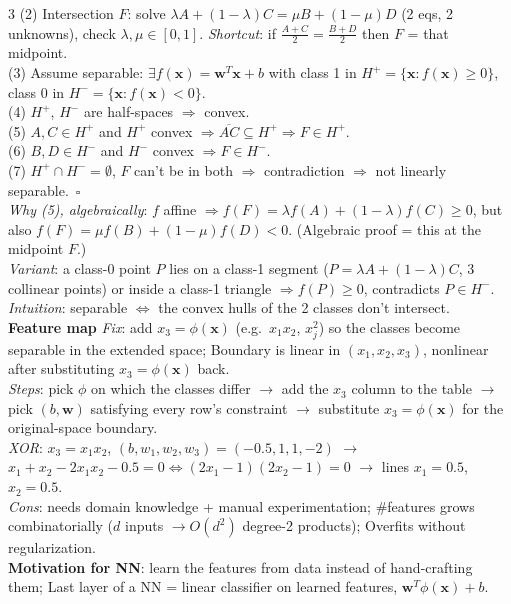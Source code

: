 \documentclass[10pt]{article}
\newcommand{\vx}{\mathbf{x}}
\newcommand{\vw}{\mathbf{w}}
\newcommand{\sub}[1]{\textit{#1}:}  %
\begin{document}
\begin{multicols*}{3}
(2) Intersection $F$: solve $\lambda A+(1-\lambda)C=\mu B+(1-\mu)D$ (2 eqs, 2 unknowns), check $\lambda,\mu\in[0,1]$. \sub{Shortcut} if $\frac{A+C}{2}=\frac{B+D}{2}$ then $F$ = that midpoint.\\
(3) Assume separable: $\exists f(\vx)=\vw^T\vx+b$ with class 1 in $H^+=\{\vx:f(\vx)\ge0\}$, class 0 in $H^-=\{\vx:f(\vx)<0\}$.\\
(4) $H^+$, $H^-$ are half-spaces $\Rightarrow$ convex.\\
(5) $A,C\in H^+$ and $H^+$ convex $\Rightarrow\overline{AC}\subseteq H^+\Rightarrow F\in H^+$.\\
(6) $B,D\in H^-$ and $H^-$ convex $\Rightarrow F\in H^-$.\\
(7) $H^+\cap H^-=\emptyset$, $F$ can't be in both $\Rightarrow$ contradiction $\Rightarrow$ not linearly separable.\ $\square$\\
\sub{Why (5), algebraically} $f$ affine $\Rightarrow f(F)=\lambda f(A)+(1-\lambda)f(C)\ge0$, but also $f(F)=\mu f(B)+(1-\mu)f(D)<0$. (Algebraic proof = this at the midpoint $F$.)\\
\sub{Variant} a class-0 point $P$ lies on a class-1 segment ($P=\lambda A+(1-\lambda)C$, 3 collinear points) or inside a class-1 triangle $\Rightarrow f(P)\ge0$, contradicts $P\in H^-$.\\
\sub{Intuition} separable $\iff$ the convex hulls of the 2 classes don't intersect.\\
\textbf{Feature map} \sub{Fix} add $x_3=\phi(\vx)$ (e.g.\ $x_1x_2$, $x_j^2$) so the classes become separable in the extended space; Boundary is linear in $(x_1,x_2,x_3)$, nonlinear after substituting $x_3=\phi(\vx)$ back.\\
\sub{Steps} pick $\phi$ on which the classes differ $\to$ add the $x_3$ column to the table $\to$ pick $(b,\vw)$ satisfying every row's constraint $\to$ substitute $x_3=\phi(\vx)$ for the original-space boundary.\\
\sub{XOR} $x_3=x_1x_2$, $(b,w_1,w_2,w_3)=(-0.5,1,1,-2)$ $\to$ $x_1+x_2-2x_1x_2-0.5=0\iff(2x_1-1)(2x_2-1)=0$ $\to$ lines $x_1=0.5$, $x_2=0.5$.\\
\sub{Cons} needs domain knowledge + manual experimentation; \#features grows combinatorially ($d$ inputs $\to O(d^2)$ degree-2 products); Overfits without regularization.\\
\textbf{Motivation for NN}: learn the features from data instead of hand-crafting them; Last layer of a NN = linear classifier on learned features, $\vw^T\phi(\vx)+b$.


\end{multicols*}
\end{document}

